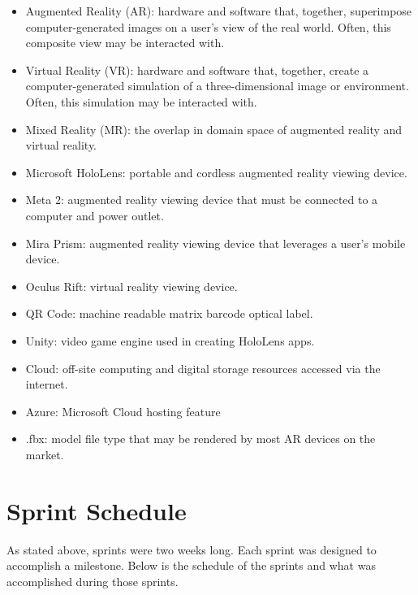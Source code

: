 \begin{itemize}
	\item Augmented Reality (AR): hardware and software that, together, superimpose computer-generated images on a user's view of the real world. Often, this composite view may be interacted with. 

	\item Virtual Reality (VR): hardware and software that, together, create a computer-generated simulation of a three-dimensional image or environment. Often, this simulation may be interacted with. 

	\item Mixed Reality (MR): the overlap in domain space of augmented reality and virtual reality. 

	\item Microsoft HoloLens: portable and cordless augmented reality viewing device. 

	\item Meta 2: augmented reality viewing device that must be connected to a computer and power outlet. 

	\item Mira Prism: augmented reality viewing device that leverages a user's mobile device.

	\item Oculus Rift: virtual reality viewing device. 

    \item QR Code: machine readable matrix barcode optical label.
    
    \item Unity: video game engine used in creating HoloLens apps.

	\item Cloud: off-site computing and digital storage resources accessed via the internet. 

    \item Azure: Microsoft Cloud hosting feature

	\item .fbx: model file type that may be rendered by most AR devices on the market. 
\end{itemize}


\section{Sprint Schedule}
As stated above, sprints were two weeks long. Each sprint was designed to accomplish a milestone. 
Below is the schedule of the sprints and what was accomplished during those sprints.

